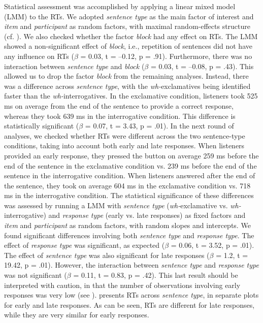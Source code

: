 \documentclass[output=paper]{langsci/langscibook}
\begin{document}
Statistical assessment was accomplished by applying a linear mixed model (LMM) to the RTs. We adopted \textit{sentence type} as the main factor of interest and \textit{item} and \textit{participant} as random factors, with maximal random-effects structure (cf. \citealt{Barr2013}). We also checked whether the factor \textit{block} had any effect on RTs. The LMM showed a non-significant effect of \textit{block}, i.e., repetition of sentences did not have any influence on RTs ($\beta $ = 0.03, t = –0.12, p = .91). Furthermore, there was no interaction between \textit{sentence type} and \textit{block} ($\beta $ = 0.03, t = –0.08, p = .43). This allowed us to drop the factor \textit{block} from the remaining analyses. Instead, there was a difference across \textit{sentence type}, with the \textit{wh-}exclamatives being identified faster than the \textit{wh-}interrogatives. In the exclamative condition, listeners took 525 ms on average from the end of the sentence to provide a correct response, whereas they took 639 ms in the interrogative condition. This difference is statistically significant ($\beta $ = 0.07, t = 3.43, p = .01). In the next round of analyses, we checked whether RTs were different across the two sentence-type conditions, taking into account both early and late responses. When listeners provided an early response, they pressed the button on average 259 ms before the end of the sentence in the exclamative condition vs. 239 ms before the end of the sentence in the interrogative condition. When listeners answered after the end of the sentence, they took on average 604 ms in the exclamative condition vs. 718 ms in the interrogative condition. The statistical significance of these differences was assessed by running a LMM with \textit{sentence type} (\textit{wh-}exclamative vs. \textit{wh-}interrogative) and \textit{response type} (early vs. late responses) as fixed factors and \textit{item} and \textit{participant} as random factors, with random slopes and intercepts. We found significant differences involving both \textit{sentence type} and \textit{response type}. The effect of \textit{response type} was significant, as expected ($\beta $ = 0.06, t = 3.52, p = .01). The effect of \textit{sentence type} was also significant for late responses ($\beta $ = 1.2, t = 19.42, p = .01). However, the interaction between \textit{sentence type} and \textit{response type} was not significant ($\beta $ = 0.11, t = 0.83, p = .42). This last result should be interpreted with caution, in that the number of observations involving early responses was very low (see ).  presents RTs across \textit{sentence type}, in separate plots for early and late responses. As can be seen, RTs are different for late responses, while they are very similar for early responses.
\end{document}
